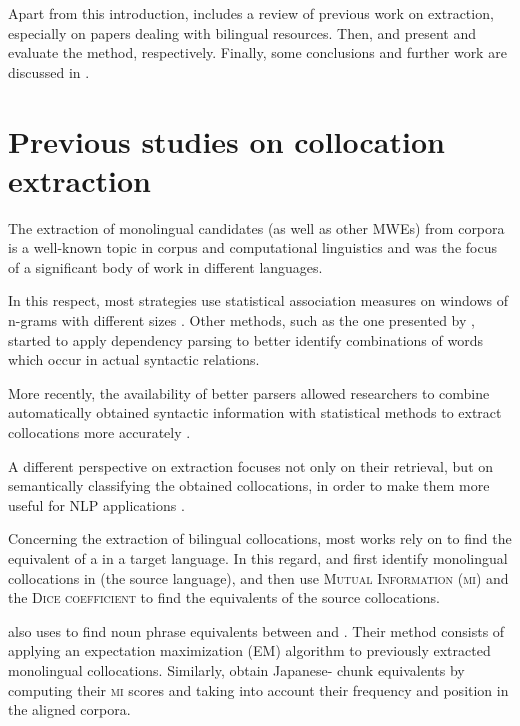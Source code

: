 \documentclass[output=paper,modfonts,nonflat]{langsci/langscibook}
\begin{document}
Apart from this introduction,  includes a review of previous work on 
extraction, especially on papers dealing with bilingual resources. Then, 
and  present and evaluate the method, respectively. Finally, some conclusions
and further work are discussed in .


%
\section{Previous studies on collocation extraction}
\label{garcia:sec:rw}

The extraction of monolingual  candidates (as well as other MWEs)
from corpora is a well-known topic in corpus and computational linguistics and was the focus of a significant body of work in different languages.

In this respect, most strategies use statistical association measures on windows of
n-grams with different sizes \citep{church1990, smadja1993}. Other methods, such as the
one presented by \citet{lin1999}, started to apply dependency parsing to better identify
combinations of words which occur in actual syntactic relations.

More recently, the availability of better parsers allowed researchers to combine automatically
obtained syntactic information with statistical methods to extract collocations more accurately \citep{evert2008,seretan2011syntax}.

A different perspective on  extraction focuses not only on their retrieval, but on
semantically classifying the obtained collocations, in order to make them more useful for NLP
applications \citep{wanner2006,wanner2016}.

Concerning the extraction of bilingual collocations, most works rely on  to find the
equivalent of a  in a target language. In this regard, \citet{smadja1992} and \citet{smadja1996}
first identify monolingual collocations in  (the source language), and then use \textsc{Mutual
  Information} (\textsc{mi}) and the \textsc{Dice coefficient} to find the  equivalents of the source
collocations. 

\citet{kupiec1993} also uses  to find noun phrase equivalents between 
and . Their method consists of applying an expectation maximization (EM) algorithm to previously
extracted monolingual collocations.
Similarly, \citet{haruno1996} obtain Japanese- chunk equivalents by computing
their \textsc{mi} scores and taking into account their frequency and position in the aligned corpora.
\end{document}
